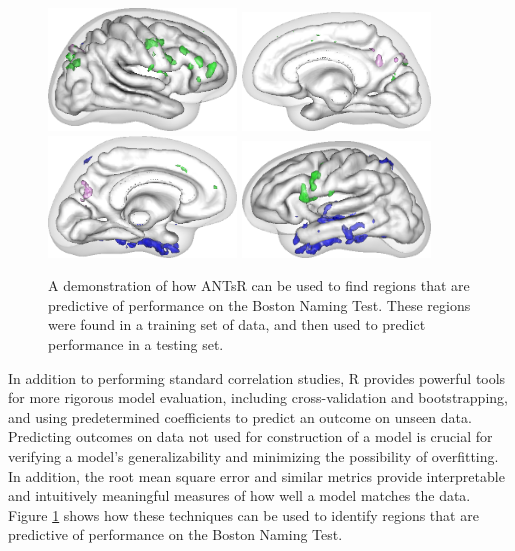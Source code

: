 \begin{figure}
\centering
\includegraphics[width=5cm]{figs/bntrenderLateral1.png}
\includegraphics[width=5cm]{figs/bntrenderSagittal1.png}
\includegraphics[width=5cm]{figs/bntrenderSagittal2.png}
\includegraphics[width=5cm]{figs/bntrenderLateral2.png}
\caption{A demonstration of how ANTsR can be used to find regions that are predictive of performance on the Boston Naming Test.  These regions were found in a training set of data, and then used to predict performance in a testing set.}
\label{fig:bnt}
\end{figure}

In addition to performing standard correlation studies, R provides powerful tools for more rigorous model evaluation, including cross-validation and bootstrapping, and using predetermined coefficients to predict an outcome on unseen data.  Predicting outcomes on data not used for construction of a model is crucial for verifying a model's generalizability and minimizing the possibility of overfitting.  In addition, the root mean square error and similar metrics provide interpretable and intuitively meaningful measures of how well a model matches the data.  Figure \ref{fig:bnt} shows how these techniques can be used to identify regions that are predictive of performance on the Boston Naming Test. 